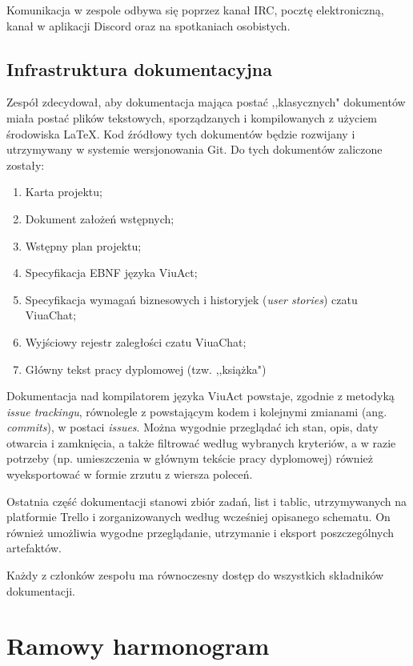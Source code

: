 \documentclass[11pt,oneside,a4paper,titlepage,onecolumn]{article}
\begin{document}
Komunikacja w zespole odbywa się poprzez kanał IRC, pocztę elektroniczną, kanał w aplikacji Discord oraz na spotkaniach osobistych.

\subsection{Infrastruktura dokumentacyjna}

Zespół zdecydował, aby dokumentacja mająca postać ,,klasycznych" dokumentów miała postać plików tekstowych, 
sporządzanych i kompilowanych z użyciem środowiska \LaTeX. Kod źródłowy tych dokumentów będzie rozwijany i utrzymywany 
w systemie wersjonowania Git. Do tych dokumentów zaliczone zostały:
\begin{enumerate}
	\item Karta projektu;
	\item Dokument założeń wstępnych;
	\item Wstępny plan projektu;
	\item Specyfikacja EBNF języka ViuAct;
	\item Specyfikacja wymagań biznesowych i historyjek (\textit{user stories}) czatu ViuaChat;
	\item Wyjściowy rejestr zaległości czatu ViuaChat;
	\item Główny tekst pracy dyplomowej (tzw. ,,książka")
\end{enumerate}

Dokumentacja nad kompilatorem języka ViuAct powstaje, zgodnie z metodyką \textit{issue trackingu}, równolegle z
powstającym kodem i kolejnymi zmianami (ang. \textit{commits}), w postaci \textit{issues}. Można wygodnie przeglądać
ich stan, opis, daty otwarcia i zamknięcia, a także filtrować według wybranych kryteriów, a w razie potrzeby (np.
umieszczenia w głównym tekście pracy dyplomowej) również wyeksportować w formie zrzutu z wiersza poleceń.

Ostatnia część dokumentacji stanowi zbiór zadań, list i tablic, utrzymywanych na platformie Trello i zorganizowanych
według wcześniej opisanego schematu. On również umożliwia wygodne przeglądanie, utrzymanie i eksport poszczególnych
artefaktów.

Każdy z członków zespołu ma równoczesny dostęp do wszystkich składników dokumentacji.

\section{Ramowy harmonogram}
\end{document}
